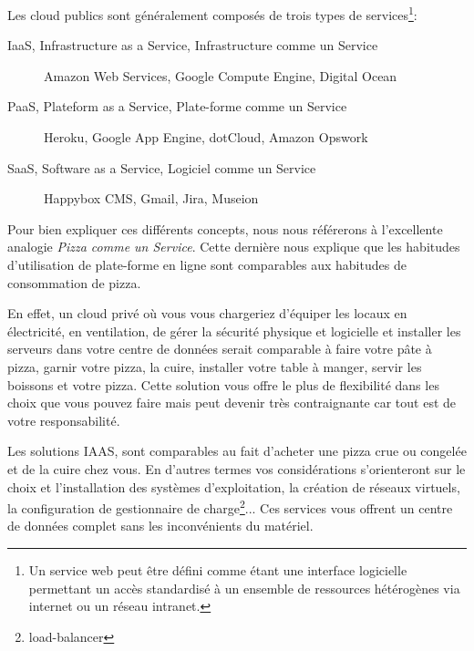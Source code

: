 \documentclass[11pt, a4paper ]{article}
\begin{document}
\begin{spacing}{1.5}
Les cloud publics sont généralement composés de trois types de services\footnote{Un service web\cite{webServicesDef} peut être défini comme étant une interface logicielle permettant un accès standardisé à un ensemble de ressources hétérogènes via internet ou un réseau intranet.}:
\begin{description}

	\item[IaaS, Infrastructure as a Service, Infrastructure comme un Service] Amazon Web Services, Google Compute Engine, Digital Ocean

	\item[PaaS, Plateform as a Service, Plate-forme comme un Service] Heroku, Google App Engine, dotCloud, Amazon Opswork

	\item[SaaS, Software as a Service, Logiciel comme un Service]
	Happybox CMS, Gmail, Jira, Museion

\end{description}

Pour bien expliquer ces différents concepts, nous nous référerons à l'excellente analogie \emph{Pizza comme un Service}\cite{PizzaasaService}. Cette dernière nous explique que les habitudes d'utilisation de plate-forme en ligne sont comparables aux habitudes de consommation de pizza.

En effet, un cloud privé où vous vous chargeriez d'équiper les locaux en électricité, en ventilation, de gérer la sécurité physique et logicielle et installer les serveurs dans votre centre de données serait comparable à faire votre pâte à pizza, garnir votre pizza, la cuire, installer votre table à manger, servir les boissons et votre pizza. Cette solution vous offre le plus de flexibilité dans les choix que vous pouvez faire mais peut devenir très contraignante car tout est de votre responsabilité.

Les solutions IAAS, sont comparables au fait d'acheter une pizza crue ou congelée et de la cuire chez vous. En d'autres termes vos considérations s'orienteront sur le choix et l'installation des systèmes d'exploitation, la création de réseaux virtuels, la configuration de gestionnaire de charge\footnote{load-balancer}... Ces services vous offrent un centre de données complet sans les inconvénients du matériel.


\end{spacing}
\end{document}
